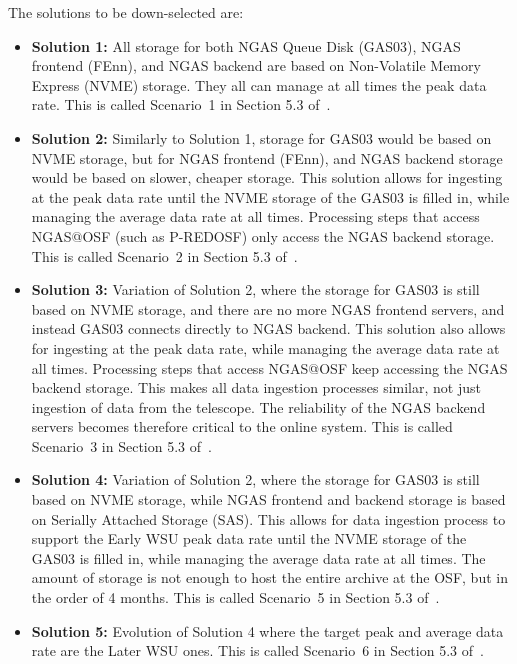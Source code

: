 The solutions to be down-selected are:

\begin{itemize}[itemsep=-0.5em]
	\item \textbf{Solution 1:} All storage for both NGAS Queue Disk (GAS03), NGAS frontend (FEnn), and NGAS backend are based on Non-Volatile Memory Express (NVME) storage. They all can manage at all times the peak data rate. This is called Scenario~1 in Section 5.3 of~\cite{dtas}.
	\item \textbf{Solution 2:} Similarly to Solution 1, storage for GAS03 would be based on NVME storage, but for NGAS frontend (FEnn), and NGAS backend storage would be based on slower, cheaper storage. This solution allows for ingesting at the peak data rate until the NVME storage of the GAS03 is filled in, while managing the average data rate at all times. Processing steps that access NGAS@OSF (such as P-REDOSF) only access the NGAS backend storage. This is called Scenario~2 in Section 5.3 of~\cite{dtas}.
	\item \textbf{Solution 3:} Variation of Solution 2, where the storage for GAS03 is still based on NVME storage, and there are no more NGAS frontend servers, and instead GAS03 connects directly to NGAS backend. This solution also allows for ingesting at the peak data rate, while managing the average data rate at all times. Processing steps that access NGAS@OSF keep accessing the NGAS backend storage. This makes all data ingestion processes similar, not just ingestion of data from the telescope. The reliability of the NGAS backend servers becomes therefore critical to the online system. This is called Scenario~3 in Section 5.3 of~\cite{dtas}.
	\item \textbf{Solution 4:} Variation of Solution 2, where the storage for GAS03 is still based on NVME storage, while NGAS frontend and backend storage is based on Serially Attached Storage (SAS). This allows for data ingestion process to support the Early WSU peak data rate until the NVME storage of the GAS03 is filled in, while managing the average data rate at all times. The amount of storage is not enough to host the entire archive at the OSF, but in the order of 4 months. This is called Scenario~5 in Section 5.3 of~\cite{dtas}.
	\item \textbf{Solution 5:} Evolution of Solution 4 where the target peak and average data rate are the Later WSU ones. This is called Scenario~6 in Section 5.3 of~\cite{dtas}.
\end{itemize}

